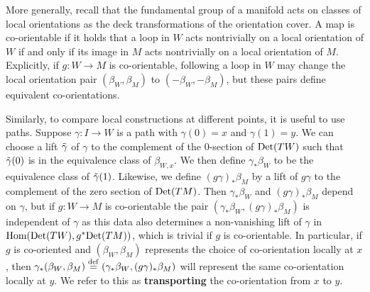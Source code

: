 More generally, recall that the fundamental group of a manifold acts on classes of local orientations as the deck transformations of the orientation cover.
A map is co-orientable if it holds that a loop in $W$ acts nontrivially on a local orientation of $W$ if and only if its image in $M$ acts nontrivially on a local orientation of $M$.
Explicitly, if $g \colon W \to M$ is co-orientable, following a loop in $W$ may change the local orientation pair
$(\beta_W, \beta_M)$ to $(-\beta_W, -\beta_M)$, but these pairs define equivalent co-orientations.

Similarly, to compare local constructions at different points, it is useful to use paths.
Suppose $\gamma \colon I \to W$ is a path with $\gamma(0) = x$ and $\gamma(1) = y$.
We can choose a lift $\tilde \gamma$ of $\gamma$ to the complement of the $0$-section of ${\rm Det}(TW)$ such that $\tilde \gamma(0)$ is in the equivalence class of $\beta_{W,x}$.
We then define $\gamma_*\beta_{W}$ to be the equivalence class of $\tilde \gamma(1)$.
Likewise, we define $(g\gamma)_*\beta_M$ by a lift of $g\gamma$ to the complement of the zero section of ${\rm Det}(TM)$.
Then $\gamma_*\beta_{W}$ and $(g\gamma)_*\beta_M$ depend on $\gamma$, but if $g \colon W \to M$ is co-orientable the pair $(\gamma_*\beta_{W}, (g\gamma)_*\beta_M)$ is independent of $\gamma$ as this data also determines a non-vanishing lift of $\gamma$ in $\textup{Hom}({\rm Det}(TW),g^*{\rm Det}(TM))$, which is trivial if $g$ is co-orientable.
In particular, if $g$ is co-oriented and $(\beta_{W}, \beta_M)$ represents the choice of co-orientation locally at $x$, then $\gamma_*(\beta_W,\beta_M) \stackrel{\mathrm{def}}{=} (\gamma_*\beta_{W}, (g\gamma)_*\beta_M)$ will represent the same co-orientation locally at $y$.
We refer to this as \textbf{transporting} the co-orientation from $x$ to $y$.

